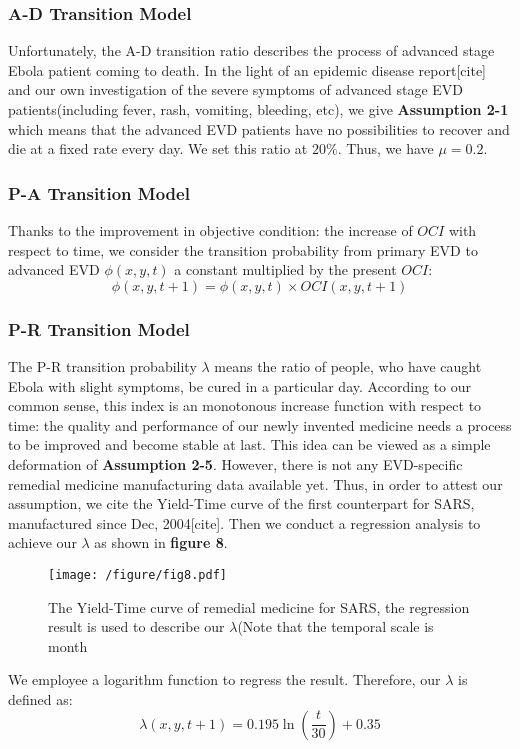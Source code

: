 \subsubsection{A-D Transition Model}
Unfortunately, the A-D transition ratio describes the process of advanced stage Ebola patient coming to death. In the light of an epidemic disease report[cite] and our own investigation of the severe symptoms of advanced stage EVD patients(including fever, rash, vomiting, bleeding, etc), we give \textbf{Assumption 2-1} which means that the advanced EVD patients have no possibilities to recover and die at a fixed rate every day. We set this ratio at $20\%$. Thus, we have $\mu=0.2$.  

\subsubsection{P-A Transition Model}
Thanks to the improvement in objective condition: the increase of $OCI$ with respect to time, we consider the transition probability from primary EVD to advanced EVD $\phi(x,y,t)$ a constant multiplied by the present $OCI$:
\begin{equation}
 \phi \left( x,y,t+1\right) =\phi \left( x,y,t\right) \times OCI(x,y,t+1)
\end{equation}

 \subsubsection{P-R Transition Model}
The P-R transition probability $\lambda$ means the ratio of people, who have caught Ebola with slight symptoms, be cured in a particular day. According to our common sense, this index is an monotonous increase function with respect to time: the quality and performance of our newly invented medicine needs a process to be improved and become stable at last. This idea can be viewed as a simple deformation of \textbf{Assumption 2-5}. However, there is not any EVD-specific remedial medicine manufacturing data available yet. Thus, in order to attest our assumption, we cite the Yield-Time curve of the first counterpart for SARS, manufactured since Dec, 2004[cite]. Then we conduct a regression analysis to achieve our $\lambda$ as shown in \textbf{figure 8}. 
\begin{figure}[htbp]
\centering
\texttt{[image: /figure/fig8.pdf]}
\caption{The Yield-Time curve of remedial medicine for SARS, the regression result is used to describe our $\lambda$(Note that the temporal scale is month}\label{fig:8}
\end{figure}
We employee a logarithm function to regress the result. Therefore, our $\lambda$ is defined as:
\begin{equation}
\lambda \left( x,y,t+1\right) =0.195\ln \left( \dfrac{t}{30}\right) +0.35
\end{equation}

